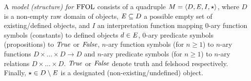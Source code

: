 \begin{definition}
  A \emph{model (structure) for $\text{\textrm{FFOL}}$} consists of a quadruple
  $M = \langle D, \mathit{E}, I, \star\rangle$, where $D$ is a non-empty raw domain of
  objects, $\mathit{E}\subseteq D$ a possible empty set of existing/defined objects, and $I$ an interpretation function
  mapping $0$-ary function symbols (constants) to defined objects $d\in \mathit{E}$, 
 $0$-ary predicate symbols (propositions) to $\mathit{True}$ or $\mathit{False}$, 
  $n$-ary function symbols (for $n\geq 1$) to $n$-ary functions
  $D \times \ldots \times D \longrightarrow D$ and $n$-ary predicate
  symbols (for $n\geq 1$) to $n$-ary relations
  $D \times \ldots \times D$. $\mathit{True}$ or $\mathit{False}$ denote truth and
  felshood respectively. Finally, $\star\in D\setminus \mathit{E}$ is a designated
  (non-existing/undefined) object. 
\end{definition}

